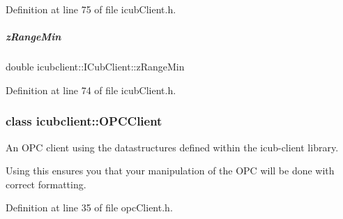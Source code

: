 Definition at line 75 of file icub\+Client.\+h.

\mbox{\label{group__icubclient__clients_a1006409da155ce1f67418577656c04b7}} 
\subparagraph{\texorpdfstring{z\+Range\+Min}{zRangeMin}}
{\footnotesize\ttfamily double icubclient\+::\+I\+Cub\+Client\+::z\+Range\+Min\hspace{0.3cm}{\ttfamily [protected]}}



Definition at line 74 of file icub\+Client.\+h.

\label{classicubclient_1_1OPCClient}
\subsubsection{class icubclient\+:\+:O\+P\+C\+Client}
An O\+PC client using the datastructures defined within the icub-\/client library. 

Using this ensures you that your manipulation of the O\+PC will be done with correct formatting. 

Definition at line 35 of file opc\+Client.\+h.

